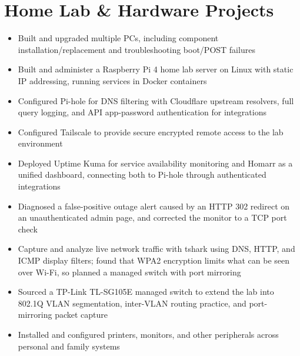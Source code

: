 \documentclass[letterpaper,10.5pt]{article}
\begin{document}
\section*{Home Lab \& Hardware Projects}
\begin{itemize}
  \item Built and upgraded multiple PCs, including component installation/replacement and
        troubleshooting boot/POST failures
  \item Built and administer a Raspberry Pi 4 home lab server on Linux with static IP addressing,
        running services in Docker containers
  \item Configured Pi-hole for DNS filtering with Cloudflare upstream resolvers, full query logging,
        and API app-password authentication for integrations
  \item Configured Tailscale to provide secure encrypted remote access to the lab environment
  \item Deployed Uptime Kuma for service availability monitoring and Homarr as a unified dashboard,
        connecting both to Pi-hole through authenticated integrations
  \item Diagnosed a false-positive outage alert caused by an HTTP 302 redirect on an unauthenticated
        admin page, and corrected the monitor to a TCP port check
  \item Capture and analyze live network traffic with tshark using DNS, HTTP, and ICMP display
        filters; found that WPA2 encryption limits what can be seen over Wi-Fi, so planned a managed
        switch with port mirroring
  \item Sourced a TP-Link TL-SG105E managed switch to extend the lab into 802.1Q VLAN segmentation,
        inter-VLAN routing practice, and port-mirroring packet capture
  \item Installed and configured printers, monitors, and other peripherals across personal and
        family systems
\end{itemize}

\end{document}
